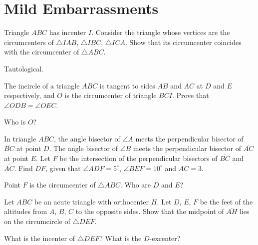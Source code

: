 \documentclass[11pt]{scrartcl}
\begin{document}
\section{Mild Embarrassments}
\begin{problem}
  [USAMO 1988] Triangle $ABC$ has incenter $I$.
  Consider the triangle whose vertices are the circumcenters of $\triangle IAB$, $\triangle IBC$,
  $\triangle ICA$.
  Show that its circumcenter coincides with the circumcenter of $\triangle ABC$.
  \begin{hint}
    Tautological.
  \end{hint}
\end{problem}
\begin{problem}
  [CGMO 2012] The incircle of a triangle $ABC$ is tangent to sides $AB$ and $AC$ at $D$ and $E$ respectively,
  and $O$ is the circumcenter of triangle $BCI$. Prove that $\angle ODB = \angle OEC$.
  \begin{hint}
    Who is $O$?
  \end{hint}
\end{problem}
\begin{problem}
   In triangle $ABC$, the angle bisector of $\angle A$
  meets the perpendicular bisector of $\overline{BC}$ at point $D$.
  The angle bisector of $\angle B$ meets the perpendicular bisector
  of $\overline{AC}$ at point $E$.
  Let $F$ be the intersection of the perpendicular bisectors of $\overline{BC}$ and $\overline{AC}$.
  Find $DF$, given that $\angle ADF = 5^{\circ}$,
  $\angle BEF = 10^{\circ}$ and $AC = 3$.
  \begin{hint}
    Point $F$ is the circumcenter of $\triangle ABC$.
    Who are $D$ and $E$?
  \end{hint}
\end{problem}
\begin{problem}
  Let $ABC$ be an acute triangle with orthocenter $H$.
  Let $D$, $E$, $F$ be the feet of the altitudes from $A$, $B$, $C$ to the opposite sides.
  Show that the midpoint of $\overline{AH}$ lies on the circumcircle of $\triangle DEF$.
  \begin{hint}
    What is the incenter of $\triangle DEF$?
    What is the $D$-excenter?
  \end{hint}
\end{problem}
\end{document}
